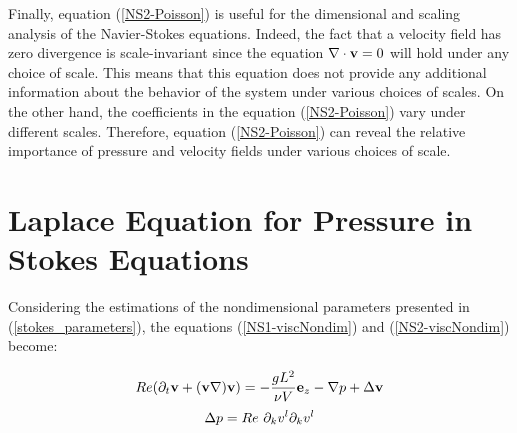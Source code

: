 Finally, equation (\ref{NS2-Poisson}) is useful for the dimensional and scaling analysis of the Navier-Stokes equations. Indeed, the fact that a velocity field has zero divergence is scale-invariant since the equation $\nabla\cdot \mathbf{v} = 0$ will hold under any choice of scale. This means that this equation does not provide any additional information about the behavior of the system under various choices of scales. On the other hand, the coefficients in the equation (\ref{NS2-Poisson}) vary under different scales. Therefore, equation (\ref{NS2-Poisson}) can reveal the relative importance of pressure and velocity fields under various choices of scale. 

\section{Laplace Equation for Pressure in Stokes Equations} \label{pressure_laplace}

Considering the estimations of the nondimensional parameters presented in (\ref{stokes_parameters}), the equations (\ref{NS1-viscNondim}) and (\ref{NS2-viscNondim}) become:

\begin{equation} 
Re(\partial_t\mathbf{v} + (\mathbf{v}\nabla)\mathbf{v}) = -\frac{gL^2}{\nu V} \mathbf{e}_z - \nabla p + \Delta\mathbf{v} 
\end{equation}
\begin{equation} 
\Delta p = Re ~\partial_kv^l\partial_kv^l
\end{equation}